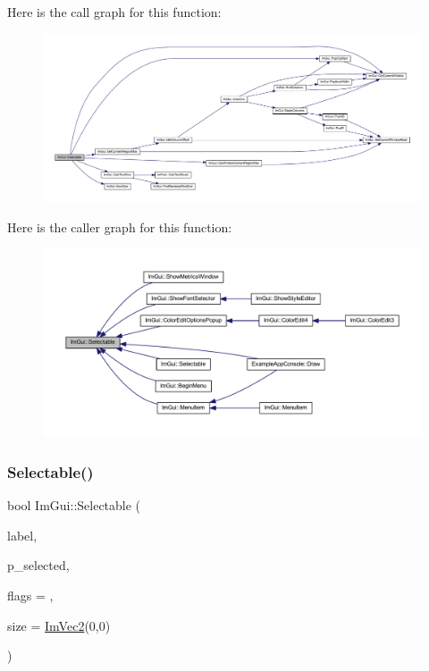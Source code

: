 Here is the call graph for this function\+:
\nopagebreak
\begin{figure}[H]
\begin{center}
\leavevmode
\includegraphics[width=350pt]{namespace_im_gui_af98575238bda183a523df19fb447af60_cgraph}
\end{center}
\end{figure}
Here is the caller graph for this function\+:
\nopagebreak
\begin{figure}[H]
\begin{center}
\leavevmode
\includegraphics[width=350pt]{namespace_im_gui_af98575238bda183a523df19fb447af60_icgraph}
\end{center}
\end{figure}
\mbox{\label{namespace_im_gui_a9229a9c3c304ffc0c98ffe2ee4ff5e40}} 
\subsubsection{\texorpdfstring{Selectable()}{Selectable()}\hspace{0.1cm}{\footnotesize\ttfamily [2/2]}}
{\footnotesize\ttfamily bool Im\+Gui\+::\+Selectable (\begin{DoxyParamCaption}\item[{const char $\ast$}]{label,  }\item[{bool $\ast$}]{p\+\_\+selected,  }\item[{\mbox{\hyperlink{imgui_8h_aab0fe56421d75949dedfbfbbaa674b6b}{Im\+Gui\+Selectable\+Flags}}}]{flags = {},  }\item[{const \mbox{\hyperlink{struct_im_vec2}{Im\+Vec2}} \&}]{size = {\ttfamily \mbox{\hyperlink{struct_im_vec2}{Im\+Vec2}}(0,0)} }\end{DoxyParamCaption})}

